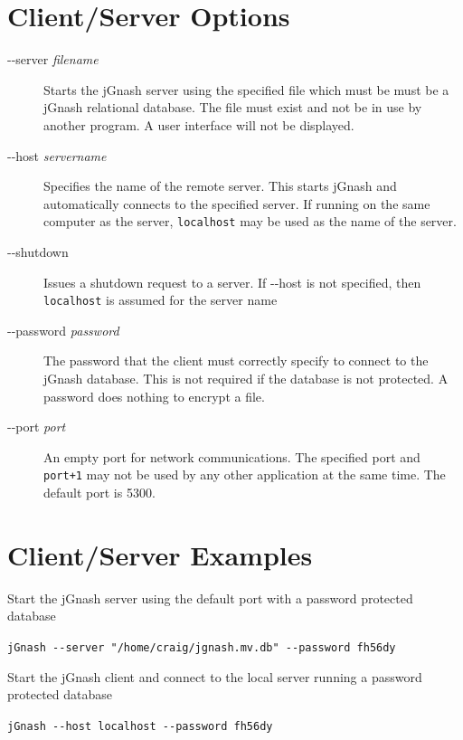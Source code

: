 \documentclass[letterpaper,12pt]{book}
\begin{document}
    \section{Client/Server Options}
    \begin{description}
        \item[-{}-server \textit{filename}]
        Starts the jGnash server using the specified file which must be must be a jGnash relational database.
        The file must exist and not be in use by another program.
        A user interface will not be displayed.
        \item[-{}-host \textit{servername}]
        Specifies the name of the remote server.
        This starts jGnash and automatically connects to the specified server.
        If running on the same computer as the server, \texttt{localhost} may be used as the name of the server.
        \item[-{}-shutdown]
        Issues a shutdown request to a server.
        If -{}-host is not specified, then \texttt{localhost} is assumed for the server name
        \item[-{}-password \textit{password}]
        The password that the client must correctly specify to connect to the jGnash database.
        This is not required if the database is not protected.
        A password does nothing to encrypt a file.
        \item[-{}-port \textit{port}]
        An empty port for network communications.
        The specified port and \texttt{port+1} may not be used by any other application at the same time.
        The default port is 5300.
    \end{description}

    \newpage
    \section{Client/Server Examples}
    Start the jGnash server using the default port with a password protected database
    \begin{mdframed}[style=info]
        \texttt{jGnash -{}-server "/home/craig/jgnash.mv.db" -{}-password fh56dy}
    \end{mdframed}

    Start the jGnash client and connect to the local server running a password protected database
    \begin{mdframed}[style=info]
        \texttt{jGnash -{}-host localhost -{}-password fh56dy}
    \end{mdframed}
\end{document}
